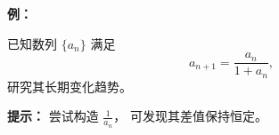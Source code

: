 \begin{ideaBox}
\textbf{例：}

已知数列 $\{a_n\}$ 满足  
\[
a_{n+1} = \frac{a_n}{1+a_n},
\]
研究其长期变化趋势。

\textbf{提示：}  
尝试构造 $\frac{1}{a_n}$，
可发现其差值保持恒定。
\end{ideaBox}
